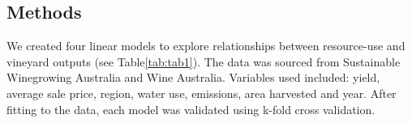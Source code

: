 \documentclass[review,12pt,authoryear]{elsarticle}
\begin{document}
\begin{linenumbers}
\section{Methods}
We created four linear models to explore relationships between resource-use and vineyard outputs (see Table\ref{tab:tab1}). The data was sourced from Sustainable Winegrowing Australia and Wine Australia. Variables used included: yield, average sale price, region, water use, emissions, area harvested and year. After fitting to the data, each model was validated using k-fold cross validation.
\begin{table}[]
      \caption{Summary of models; their predictors, covariates and variable interactions.}\label{tab:tab1}
\end{table}
\end{linenumbers}
\end{document}
